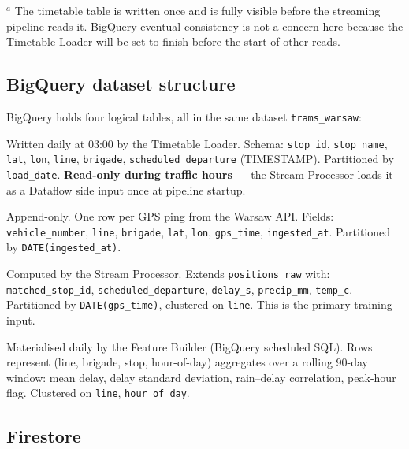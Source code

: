 \documentclass[11pt,a4paper]{article}
\begin{document}
\noindent\small
$^{a}$ The timetable table is written once and is fully visible before
the streaming pipeline reads it.
BigQuery eventual consistency is not a concern here because
the Timetable Loader will be set to finish before the start of other reads.

\normalsize

\subsection{BigQuery dataset structure}

BigQuery holds four logical tables, all in the same dataset
\texttt{trams\_warsaw}:

\begin{description}[leftmargin=2em, style=nextline, itemsep=5pt]
  \item[\texttt{timetable}]
    Written daily at 03:00 by the Timetable Loader. Schema:
    \texttt{stop\_id}, \texttt{stop\_name}, \texttt{lat}, \texttt{lon},
    \texttt{line}, \texttt{brigade}, \texttt{scheduled\_departure} (TIMESTAMP).
    Partitioned by \texttt{load\_date}.
    \textbf{Read-only during traffic hours} --- the Stream Processor loads it
    as a Dataflow side input once at pipeline startup.

  \item[\texttt{positions\_raw}]
    Append-only. One row per GPS ping from the Warsaw API.
    Fields: \texttt{vehicle\_number}, \texttt{line}, \texttt{brigade},
    \texttt{lat}, \texttt{lon}, \texttt{gps\_time}, \texttt{ingested\_at}.
    Partitioned by \texttt{DATE(ingested\_at)}.

  \item[\texttt{positions\_enriched}]
    Computed by the Stream Processor. Extends \texttt{positions\_raw} with:
    \texttt{matched\_stop\_id}, \texttt{scheduled\_departure},
    \texttt{delay\_s}, \texttt{precip\_mm}, \texttt{temp\_c}.
    Partitioned by \texttt{DATE(gps\_time)}, clustered on \texttt{line}.
    This is the primary training input.

  \item[\texttt{features}]
    Materialised daily by the Feature Builder (BigQuery scheduled SQL).
    Rows represent (line, brigade, stop, hour-of-day) aggregates over a
    rolling 90-day window: mean delay, delay standard deviation,
    rain--delay correlation, peak-hour flag.
    Clustered on \texttt{line}, \texttt{hour\_of\_day}.
\end{description}

\subsection{Firestore}
\end{document}
